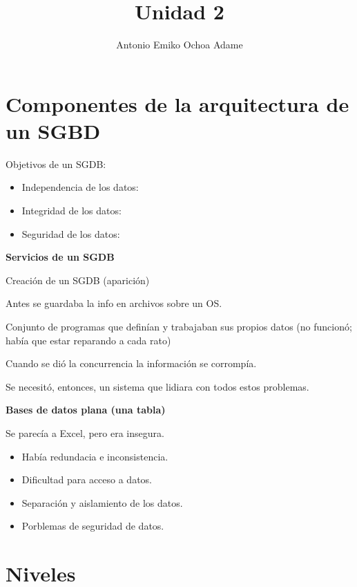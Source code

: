 \documentclass{article}
\begin{document}
\title{Unidad 2}
\author{Antonio Emiko Ochoa Adame}
\maketitle

\tableofcontents

\section{Componentes de la arquitectura de un SGBD}

Objetivos de un SGDB:

\begin{itemize}
	\item
		Independencia de los datos:
	\item
		Integridad de los datos:
	\item
		Seguridad de los datos:
\end{itemize}

\vspace{1em}
\textbf{Servicios de un SGDB}

Creación de un SGDB (aparición)

Antes se guardaba la info en archivos sobre un OS.

Conjunto de programas que definían y trabajaban sus propios datos (no funcionó;
había que estar reparando a cada rato)

Cuando se dió la concurrencia la información se corrompía.

Se necesitó, entonces, un sistema que lidiara con todos estos problemas.

\vspace{1em}
\textbf{Bases de datos plana (una tabla)}

Se parecía a Excel, pero era insegura.

\begin{itemize}
	\item
		Había redundacia e inconsistencia.

	\item
		Dificultad para acceso a datos.

	\item
		Separación y aislamiento de los datos.

	\item
		Porblemas de seguridad de datos.

\end{itemize}

\section{Niveles}
\end{document}

